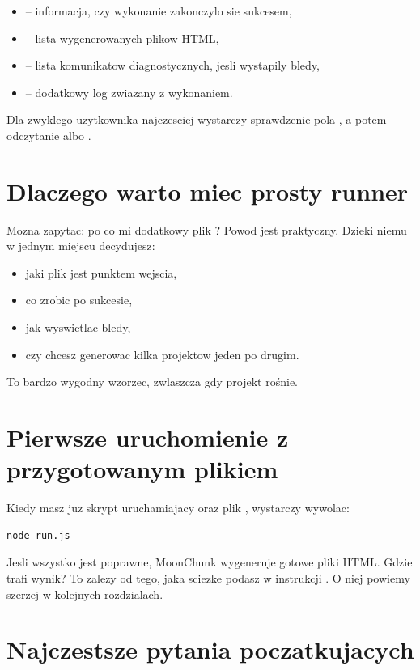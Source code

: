 \begin{itemize}
  \item {} -- informacja, czy wykonanie zakonczylo sie sukcesem,
  \item {} -- lista wygenerowanych plikow HTML,
  \item {} -- lista komunikatow diagnostycznych, jesli wystapily bledy,
  \item {} -- dodatkowy log zwiazany z wykonaniem.
\end{itemize}

Dla zwyklego uzytkownika najczesciej wystarczy sprawdzenie pola , a potem
odczytanie  albo .

\section{Dlaczego warto miec prosty runner}
Mozna zapytac: po co mi dodatkowy plik ? Powod jest praktyczny.
Dzieki niemu w jednym miejscu decydujesz:

\begin{itemize}
  \item jaki plik  jest punktem wejscia,
  \item co zrobic po sukcesie,
  \item jak wyswietlac bledy,
  \item czy chcesz generowac kilka projektow jeden po drugim.
\end{itemize}

To bardzo wygodny wzorzec, zwlaszcza gdy projekt rośnie.

\section{Pierwsze uruchomienie z przygotowanym plikiem}
Kiedy masz juz skrypt uruchamiajacy oraz plik , wystarczy wywolac:

\begin{lstlisting}[style=basecode,caption={Uruchomienie generatora}]
node run.js
\end{lstlisting}

Jesli wszystko jest poprawne, MoonChunk wygeneruje gotowe pliki HTML. Gdzie trafi wynik?
To zalezy od tego, jaka sciezke podasz w instrukcji . O niej powiemy szerzej
w kolejnych rozdzialach.

\section{Najczestsze pytania poczatkujacych}
